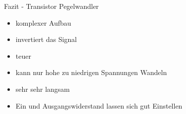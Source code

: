 
\begin{frame}[c]{Fazit - Transistor Pegelwandler}

  \begin{itemize}
    \item komplexer Aufbau
    \item invertiert das Signal
    \item teuer
    \item kann nur hohe zu niedrigen Spannungen Wandeln
    \item sehr sehr langsam
    \item Ein und Ausgangswiderstand lassen sich gut Einstellen
  \end{itemize}
\end{frame}
